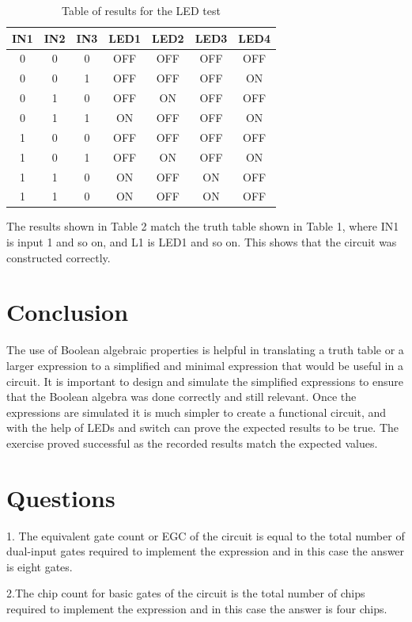 \documentclass[CMPE]{KGCOEReport}
\begin{document}
\begin{table}[H]
	\centering
	\caption{Table of results for the LED test}
	\label{fig: Table 2}
	\begin{tabular}{|ccc||cccc|}
		\hline
		IN1 & IN2 & IN3 & LED1 & LED2 & LED3 & LED4\\ \hline
		0 & 0 & 0 & OFF & OFF & OFF & OFF\\ \hline
		0 & 0 & 1 & OFF & OFF & OFF & ON\\ \hline
		0 & 1 & 0 & OFF & ON & OFF & OFF\\ \hline
		0 & 1 & 1 & ON & OFF & OFF & ON\\ \hline
		1 & 0 & 0 & OFF & OFF & OFF & OFF\\ \hline
		1 & 0 & 1 & OFF & ON & OFF & ON\\ \hline
		1 & 1 & 0 & ON & OFF & ON & OFF\\ \hline
		1 & 1 & 0 & ON & OFF & ON & OFF\\ \hline
		\hline
	\end{tabular}
\end{table}

The results shown in Table 2 match the truth table shown in Table 1, where IN1 is input 1 and so on, and L1 is LED1 and so on. This shows that the circuit was constructed correctly.

\section*{Conclusion}
The use of Boolean algebraic properties is helpful in translating a truth table or a larger expression to a simplified and minimal expression that would be useful in a circuit. It is important to design and simulate the simplified expressions to ensure that the Boolean algebra was done correctly and still relevant. Once the expressions are simulated it is much simpler to create a functional circuit, and with the help of LEDs and switch can prove the expected results to be true. The exercise proved successful as the recorded results match the expected values.

\section*{Questions}
1. The equivalent gate count or EGC of the circuit is equal to the total number of dual-input gates required to implement the expression and in this case the answer is eight gates.

2.The chip count for basic gates of the circuit is the total number of chips required to implement the expression and in this case the answer is four chips.
\end{document}
